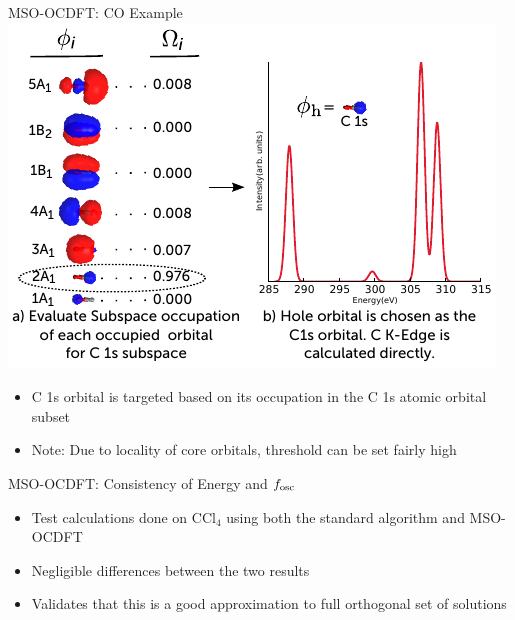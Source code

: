 \documentclass[t]{beamer}
\begin{document}
\begin{frame}{MSO-OCDFT: CO Example}
\centering
\includegraphics{CO_projection.pdf}
\begin{itemize}
\item C 1s orbital is targeted based on its occupation in the C 1s atomic orbital subset
\item Note: Due to locality of core orbitals, threshold can be set fairly high
\end{itemize}
\end{frame}


\begin{frame}{MSO-OCDFT: Consistency of Energy and $f_{\rm osc}$}
\begin{itemize}
\item Test calculations done on CCl$_4$ using both the standard algorithm and MSO-OCDFT
\begin{table}
\centering
\caption*{First 3 C core excitations in CCl$_4$}
\label{tab:CCl4}
\end{table}
\item Negligible differences between the two results
\item Validates that this is a good approximation to full orthogonal set of solutions
\end{itemize}
\end{frame}
\end{document}
